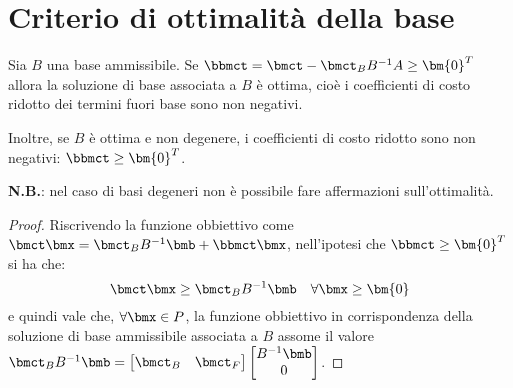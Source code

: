 \documentclass[\main/main.tex]{subfiles}
\begin{document}
\section{Criterio di ottimalità della base}
\begin{theorem}
  Sia $B$ una base ammissibile. Se $\bbmct = \bmct - \bmct_B B^{-1}A\geq \bm{0}^T$ allora la soluzione di base associata a $B$ è ottima, cioè i coefficienti di costo ridotto dei termini fuori base sono non negativi.

  Inoltre, se $B$ è ottima e non degenere, i coefficienti di costo ridotto sono non negativi: $\bbmct\geq\bm{0}^T$.

  \textbf{N.B.}: nel caso di basi degeneri non è possibile fare affermazioni sull'ottimalità.
\end{theorem}

\begin{proof}
  Riscrivendo la funzione obbiettivo come $\bmct\bmx = \bmct_B B^{-1}\bmb + \bbmct \bmx$, nell'ipotesi che $\bbmct \geq \bm{0}^T$ si ha che:
  \[
    \bmct\bmx \geq \bmct_BB^{-1}\bmb \quad \forall \bmx \geq \bm{0}
  \]
  e quindi vale che, $\forall \bmx \in P$, la funzione obbiettivo in corrispondenza della soluzione di base ammissibile associata a $B$ assome il valore $
    \bmct_BB^{-1}\bmb = \begin{bmatrix}
      \bmct_B & \bmct_F
    \end{bmatrix}
    \begin{bmatrix}
      B^{-1}\bmb \\
      0
    \end{bmatrix}
  $.

\end{proof}
\end{document}
